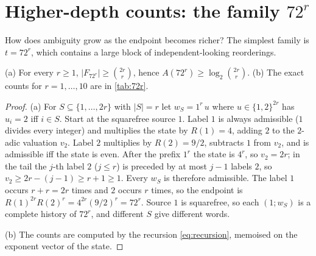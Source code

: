 \section{Higher-depth counts: the family \texorpdfstring{$72^r$}{72 to the r}}
How does ambiguity grow as the endpoint becomes richer? The simplest family is $t=72^r$, which contains a large block of independent-looking reorderings.

\begin{proposition}[growth of $72^r$]\label{prop:72r}
(a) For every $r\ge1$, $|F_{72^r}|\ge\binom{2r}{r}$, hence $A(72^r)\ge\log_2\binom{2r}{r}$.
(b) The exact counts for $r=1,\dots,10$ are in \cref{tab:72r}.
\end{proposition}
\begin{proof}
(a) For $S\subseteq\{1,\dots,2r\}$ with $|S|=r$ let $w_S=1^r\,u$ where $u\in\{1,2\}^{2r}$ has $u_i=2$ iff $i\in S$. Start at the squarefree source $1$. Label $1$ is always admissible ($1$ divides every integer) and multiplies the state by $R(1)=4$, adding $2$ to the $2$-adic valuation $v_2$. Label $2$ multiplies by $R(2)=9/2$, subtracts $1$ from $v_2$, and is admissible iff the state is even. After the prefix $1^r$ the state is $4^r$, so $v_2=2r$; in the tail the $j$-th label $2$ ($j\le r$) is preceded by at most $j-1$ labels $2$, so $v_2\ge2r-(j-1)\ge r+1\ge1$. Every $w_S$ is therefore admissible. The label $1$ occurs $r+r=2r$ times and $2$ occurs $r$ times, so the endpoint is $R(1)^{2r}R(2)^r=4^{2r}(9/2)^r=72^r$. Source $1$ is squarefree, so each $(1;w_S)$ is a complete history of $72^r$, and different $S$ give different words.

(b) The counts are computed by the recursion \eqref{eq:recursion}, memoised on the exponent vector of the state.
\end{proof}
